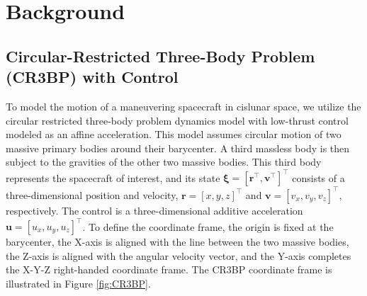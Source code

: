 \documentclass[letterpaper, preprint, paper,11pt]{AAS}	%
\begin{document}
\section{Background}

\subsection{Circular-Restricted Three-Body Problem (CR3BP) with Control}

To model the motion of a maneuvering spacecraft in cislunar space, we utilize the circular restricted three-body problem dynamics model with low-thrust control modeled as an affine acceleration. This model assumes circular motion of two massive primary bodies around their barycenter. A third massless body is then subject to the gravities of the other two massive bodies. This third body represents the spacecraft of interest, and its state $\bm{\xi} = [\bm{r}^\top, \bm{v}^\top]^\top$ consists of a three-dimensional position and velocity, $\bm{r} = [x, y, z]^\top$ and $\bm{v} = [v_x, v_y, v_z]^\top$, respectively. The control is a three-dimensional additive acceleration $\bm{u} = [u_x, u_y, u_z]^\top$. To define the coordinate frame, the origin is fixed at the barycenter, the X-axis is aligned with the line between the two massive bodies, the Z-axis is aligned with the angular velocity vector, and the Y-axis completes the X-Y-Z right-handed coordinate frame. The CR3BP coordinate frame is illustrated in Figure \ref{fig:CR3BP}. 
\end{document}
